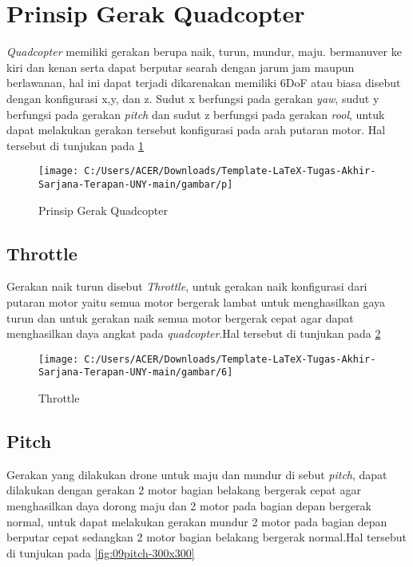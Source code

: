 \section{Prinsip Gerak Quadcopter}
\textit{Quadcopter} memiliki gerakan berupa naik, turun, mundur, maju. bermanuver ke kiri dan kenan serta dapat berputar searah dengan jarum jam maupun berlawanan, hal ini dapat terjadi dikarenakan memiliki 6DoF atau biasa disebut dengan konfigurasi x,y, dan z. Sudut x berfungsi pada gerakan \textit{yaw}, sudut y berfungsi pada gerakan \textit{pitch} dan sudut z berfungsi pada gerakan \textit{rool}, untuk dapat melakukan gerakan tersebut konfigurasi pada arah putaran motor. Hal tersebut di tunjukan pada \cref{fig:p}

\begin{figure}[H]
	\centering
	\texttt{[image: C:/Users/ACER/Downloads/Template-LaTeX-Tugas-Akhir-Sarjana-Terapan-UNY-main/gambar/p]}
	\caption{Prinsip Gerak Quadcopter}
	\label{fig:p}
\end{figure}


\subsection{Throttle}
Gerakan naik turun disebut \textit{Throttle}, untuk gerakan naik konfigurasi dari putaran motor yaitu semua motor bergerak lambat untuk menghasilkan gaya turun dan untuk gerakan naik semua motor bergerak cepat agar dapat menghasilkan daya angkat pada \textit{quadcopter}\cite{quan2020multicopter}.Hal tersebut di tunjukan pada \cref{fig:6}

\begin{figure}[H]
	\centering
	\texttt{[image: C:/Users/ACER/Downloads/Template-LaTeX-Tugas-Akhir-Sarjana-Terapan-UNY-main/gambar/6]}
	\caption{Throttle}
	\label{fig:6}
\end{figure}

\subsection{Pitch}
Gerakan yang dilakukan drone untuk maju dan mundur di sebut \textit{pitch}, dapat dilakukan dengan gerakan 2 motor bagian belakang bergerak cepat agar menghasilkan daya dorong maju dan 2 motor pada bagian depan bergerak normal, untuk dapat melakukan gerakan mundur 2 motor pada bagian depan berputar cepat sedangkan 2 motor bagian belakang bergerak normal\cite{quan2020multicopter}.Hal tersebut di tunjukan pada \cref{fig:09pitch-300x300}

